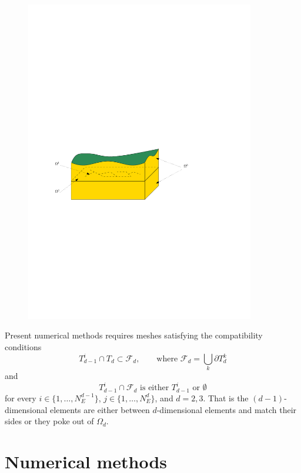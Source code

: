 \documentclass[12pt,a4paper]{report}
\begin{document}
\begin{figure}[h]
\centering
\includegraphics[width=10cm]{ground_fractures}
\label{fig:multi-dim}
\end{figure}

Present numerical methods requires meshes satisfying the compatibility conditions
\begin{equation}
        T_{d-1}^i \cap T_d \subset \mathcal{F}_d,   \qquad \text{where } \mathcal{F}_d = \bigcup_{k} \partial T_{d}^{k}
\end{equation}
and
\begin{equation}
        T_{d-1}^i \cap \mathcal{F}_d    \text{ is either $T_{d-1}^i$ or $\emptyset$}    
\end{equation}
for every $i\in\{1,\dots, N_{E}^{d-1}\}$, $j\in\{1,\dots,N_{E}^{d}\}$,  and $d=2,3$. That is the $(d-1)$-dimensional elements are either between $d$-dimensional elements and
match their sides or they poke out of $\Omega_d$. 





\chapter{Numerical methods}
\end{document}
